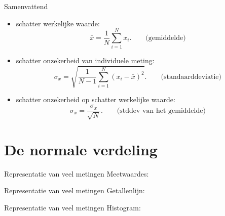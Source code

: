 \documentclass{beamer}
\begin{document}
\begin{frame}{Samenvattend}
  \begin{itemize}
    \item schatter werkelijke waarde:
    \begin{equation*}
      \bar x = \frac{1}{N}\sum_{i=1}^{N} x_i. \qquad \text{(gemiddelde)}
    \end{equation*}
    \item schatter onzekerheid van individuele meting:
    \begin{equation*}
      \sigma_x = \sqrt{\frac{1}{N-1}\sum_{i=1}^{N}(x_i - \bar x)^2}. \qquad \text{(standaarddeviatie)}
    \end{equation*}
    \item schatter onzekerheid op schatter werkelijke waarde:
    \begin{equation*}
      \sigma_{\bar x} = \frac{\sigma_x}{\sqrt N}. \qquad \text{(stddev van het gemiddelde)}
    \end{equation*}
  \end{itemize}
\end{frame}


\section{De normale verdeling}

\begin{frame}{Representatie van veel metingen}
  Meetwaardes:
  \begin{center}
    
  \end{center}
\end{frame}

\begin{frame}{Representatie van veel metingen}
  Getallenlijn:
  \begin{center}
  \end{center}
\end{frame}

\begin{frame}{Representatie van veel metingen}
  Histogram:
  \begin{center}
    
  \end{center}
\end{frame}
\end{document}
